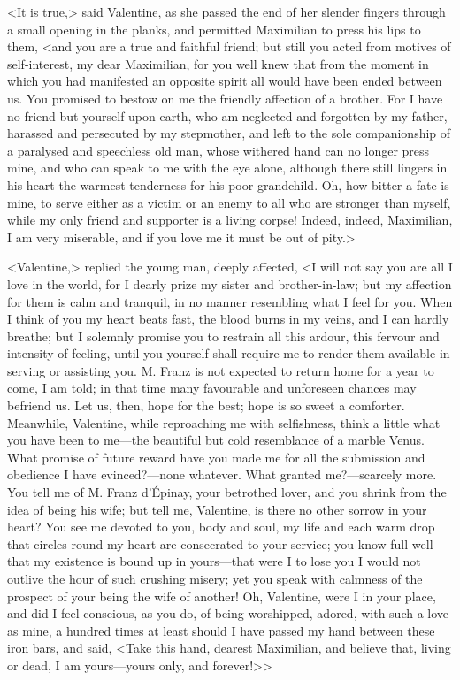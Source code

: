 <It is true,> said Valentine, as she passed the end of her slender fingers through a small opening in the planks, and permitted Maximilian to press his lips to them, <and you are a true and faithful friend; but still you acted from motives of self-interest, my dear Maximilian, for you well knew that from the moment in which you had manifested an opposite spirit all would have been ended between us. You promised to bestow on me the friendly affection of a brother. For I have no friend but yourself upon earth, who am neglected and forgotten by my father, harassed and persecuted by my stepmother, and left to the sole companionship of a paralysed and speechless old man, whose withered hand can no longer press mine, and who can speak to me with the eye alone, although there still lingers in his heart the warmest tenderness for his poor grandchild. Oh, how bitter a fate is mine, to serve either as a victim or an enemy to all who are stronger than myself, while my only friend and supporter is a living corpse! Indeed, indeed, Maximilian, I am very miserable, and if you love me it must be out of pity.> 

 <Valentine,> replied the young man, deeply affected, <I will not say you are all I love in the world, for I dearly prize my sister and brother-in-law; but my affection for them is calm and tranquil, in no manner resembling what I feel for you. When I think of you my heart beats fast, the blood burns in my veins, and I can hardly breathe; but I solemnly promise you to restrain all this ardour, this fervour and intensity of feeling, until you yourself shall require me to render them available in serving or assisting you. M. Franz is not expected to return home for a year to come, I am told; in that time many favourable and unforeseen chances may befriend us. Let us, then, hope for the best; hope is so sweet a comforter. Meanwhile, Valentine, while reproaching me with selfishness, think a little what you have been to me—the beautiful but cold resemblance of a marble Venus. What promise of future reward have you made me for all the submission and obedience I have evinced?—none whatever. What granted me?—scarcely more. You tell me of M. Franz d'Épinay, your betrothed lover, and you shrink from the idea of being his wife; but tell me, Valentine, is there no other sorrow in your heart? You see me devoted to you, body and soul, my life and each warm drop that circles round my heart are consecrated to your service; you know full well that my existence is bound up in yours—that were I to lose you I would not outlive the hour of such crushing misery; yet you speak with calmness of the prospect of your being the wife of another! Oh, Valentine, were I in your place, and did I feel conscious, as you do, of being worshipped, adored, with such a love as mine, a hundred times at least should I have passed my hand between these iron bars, and said, <Take this hand, dearest Maximilian, and believe that, living or dead, I am yours—yours only, and forever!>> 

